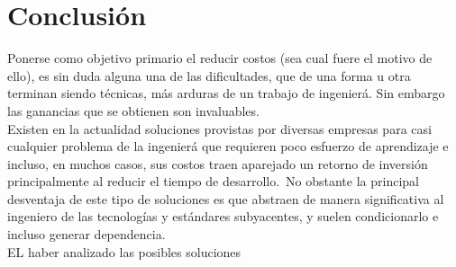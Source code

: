 \chapter{Conclusi\'on} %

Ponerse como objetivo primario el reducir costos (sea cual fuere el motivo de
ello), es sin duda alguna una de las dificultades, que de una forma u otra
terminan siendo t\'ecnicas, m\'as arduras de un trabajo de ingenier\'a. Sin
embargo las ganancias que se obtienen son invaluables.\\

Existen en la actualidad soluciones provistas por diversas empresas para casi
cualquier problema de la ingenier\'a que requieren poco esfuerzo de aprendizaje
e incluso, en muchos casos, sus costos traen aparejado un retorno de
inversi\'on principalmente al reducir el tiempo de desarrollo.\
No obstante la principal desventaja de este tipo de soluciones es que abstraen
de manera significativa al ingeniero de las tecnolog\'ias y est\'andares
subyacentes, y suelen condicionarlo e incluso generar dependencia.\\

EL haber analizado las posibles soluciones



